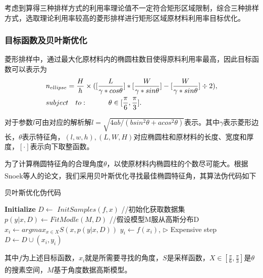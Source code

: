 \documentclass{whutmod}
\newcommand{\upcite}[1]{\textsuperscript{\cite{#1}}}
\begin{document}
			考虑到算得三种排样方式的利用率理论值不一定符合矩形区域限制，综合三种排样方式，选取理论利用率较高的菱形排样进行矩形区域原材料利用率目标优化。

			\subsubsection{目标函数及贝叶斯优化}
			菱形排样中，通过最大化原材料内的椭圆柱数目使得原料利用率最高，因此目标函数可以表示为
			\begin{align}
		&n_{ellipse}=\frac{H}{h}\times([\frac{L}{\gamma *cos\theta}]*[\frac{W}{\gamma *sin\theta}]-[\frac{W}{\gamma *sin\theta}]\div 2), 
			\\ 
			&subject\quad to: \quad \quad \quad \theta\in [\frac{\pi}{6},\frac{\pi}{3}]. \hfill
			\end{align}
			
			对于参数$l$可由对应的解析解$l=\sqrt{4ab/(bsin^2\theta +acos^2\theta )}$表示。其中$\gamma $表示菱形边长，$\theta$表示特征角，$(l,w,h),(L,W,H)$对应椭圆柱和原材料的长度、宽度和厚度，$[\cdot ]$表示向下取整函数。

			为了计算椭圆特征角的合理角度$\theta$，以使原材料内椭圆柱的个数尽可能大。根据Snoek等人的论文\upcite{8}，我们采用贝叶斯优化寻找最佳椭圆特征角，其算法伪代码如下

			\begin{algorithm}[H]
			 	\caption{贝叶斯优化伪代码}  
			 	\LinesNumbered  
			 	\textbf{Initialize} \newline
			 	 $D \leftarrow $ $InitSamples(f,x)$	\quad //初始化获取数据集\newline
			 	{
			 		$p(y|x,D)\leftarrow \textit{FitModle}(M, D)$  \quad\quad //假设模型M服从高斯分布D\newline
			 		$x_i\leftarrow argmax_{x\in X}S(x,p(y|x,D))$\newline
			 		$y_i\leftarrow f(x_i)$, $\triangleright$ Expensive step\newline
			 		 $D \leftarrow D\cup (x_i,y_i)$
			 	}
			\end{algorithm} 
		其中$f$为上述目标函数，$x_i$就是所需要寻找的角度，$S$是采样函数，$X\in [\frac{\pi}{6},\frac{\pi}{3}]$是$\theta$的搜素空间，$M$基于角度数据高斯模型\upcite{bib:8}。
\end{document}
